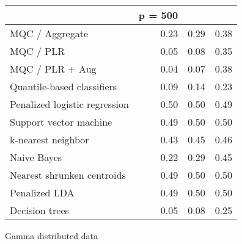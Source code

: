 \begin{table}[p]
\begin{minipage}{0.49\textwidth}
{\begin{tabular}{lrrr}
        \hline
        & p = 500 \\
        \hline

        MQC / Aggregate & 0.23 & 0.29 & 0.38 \\ 
        MQC / PLR & 0.05 & 0.08 & 0.35 \\ 
        MQC / PLR + Aug & 0.04 & 0.07 & 0.38 \\ 
        Quantile-based classifiers & 0.09 & 0.14 & 0.23 \\ 
        Penalized logistic regression & 0.50 & 0.50 & 0.49 \\ 
        Support vector machine & 0.49 & 0.50 & 0.50 \\ 
        k-nearest neighbor & 0.43 & 0.45 & 0.46 \\ 
        Naive Bayes & 0.22 & 0.29 & 0.45 \\ 
        Nearest shrunken centroids & 0.49 & 0.50 & 0.50 \\ 
        Penalized LDA & 0.49 & 0.50 & 0.50 \\ 
        Decision trees & 0.05 & 0.08 & 0.25 \\ 
        \hline
      \end{tabular}
    }
  \end{minipage}
  \begin{minipage}{0.49\textwidth}
    \centering
    Gamma distributed data \\[2ex]
\end{minipage}
\end{table}
